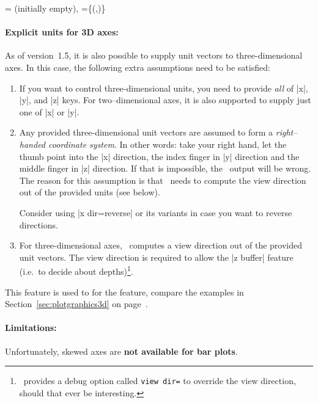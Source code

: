 \begin{pgfplotsxykeylist}{
	\x= (initially empty),
	\x={\{(,)\}}}
\paragraph{Explicit units for 3D axes:} As of version~1.5, it is also possible to supply unit vectors to three-dimensional axes. In this case, the following extra assumptions need to be satisfied:
\begin{enumerate}
	\item If you want to control three-dimensional units, you need to provide \emph{all} of |x|, |y|, and |z| keys. For two--dimensional axes, it is also supported to supply just one of |x| or |y|.
	\item Any provided three-dimensional unit vectors are assumed to form a \emph{right--handed coordinate system}. In other words: take your right hand, let the thumb point into the |x| direction, the index finger in |y| direction and the middle finger in |z| direction. If that is impossible, the \PGFPlots\ output will be wrong. The reason for this assumption is that \PGFPlots\ needs to compute the view direction out of the provided units (see below).

	Consider using |x dir=reverse| or its variants in case you want to reverse directions.

	\item For three-dimensional axes, \PGFPlots\ computes a view direction out of the provided unit vectors. The view direction is required to allow the |z buffer| feature (i.e.\ to decide about depths)\footnote{\PGFPlots\ provides a debug option called \texttt{view dir=} to override the view direction, should that ever be interesting.}.
\end{enumerate}
This feature is used to for the  feature, compare the examples in Section~\ref{sec:plotgraphics3d} on page~\pageref{sec:plotgraphics3d}.

\paragraph{Limitations:} Unfortunately, skewed axes are \textbf{not available for bar plots}.
%
%
\end{pgfplotsxykeylist}

